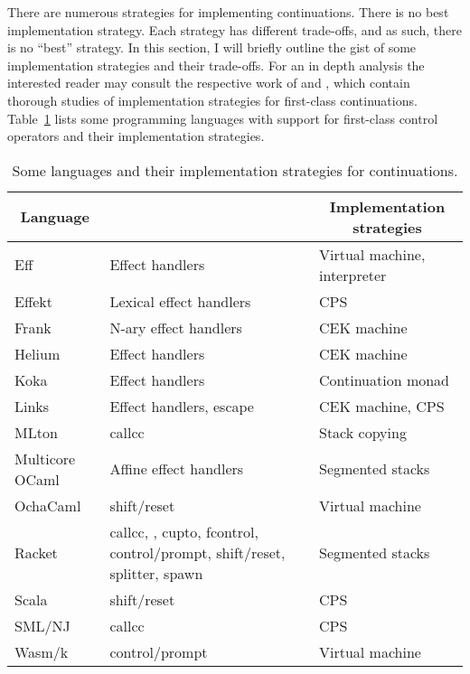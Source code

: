 \documentclass[12pt,phd,lfcs,twoside,openright,logo,leftchapter,normalheadings]{infthesis}
\theoremstyle{plain}
\theoremstyle{definition}
\begin{document}
There are numerous strategies for implementing continuations. There is
no best implementation strategy. Each strategy has different
trade-offs, and as such, there is no ``best'' strategy. In this
section, I will briefly outline the gist of some implementation
strategies and their trade-offs. For an in depth analysis the
interested reader may consult the respective work of
\citet{ClingerHO88} and \citet{FarvardinR20}, which contain thorough
studies of implementation strategies for first-class continuations.
%
Table~\ref{tbl:ctrl-operators-impls} lists some programming languages
with support for first-class control operators and their
implementation strategies.

\begin{table}
  \centering
  \begin{tabular}{| l | >{\raggedright}p{4.3cm} | l |}
    \hline
    \multicolumn{1}{|c|}{\textbf{Language}} & \multicolumn{1}{c |}{\textbf{Control operators}} & \multicolumn{1}{c|}{\textbf{Implementation strategies}}\\
    \hline
    Eff      & Effect handlers & Virtual machine, interpreter \\
    \hline
    Effekt   & Lexical effect handlers & CPS\\
    \hline
    Frank    & N-ary effect handlers & CEK machine \\
    \hline
    Helium   & Effect handlers & CEK machine \\
    \hline
    Koka     & Effect handlers & Continuation monad\\
    \hline
    Links    & Effect handlers, escape & CEK machine, CPS\\
    \hline
    MLton    & callcc & Stack copying\\
    \hline
    Multicore OCaml  & Affine effect handlers & Segmented stacks\\
    \hline
    OchaCaml & shift/reset & Virtual machine\\
    \hline
    Racket & callcc, \textCallcomc{}, cupto, fcontrol, control/prompt, shift/reset, splitter, spawn & Segmented stacks\\
    \hline
    Scala                 & shift/reset       & CPS\\
    \hline
    SML/NJ                & callcc            & CPS\\
    \hline
    Wasm/k                & control/prompt    & Virtual machine \\
    \hline
  \end{tabular}
  \caption{Some languages and their implementation strategies for continuations.}\label{tbl:ctrl-operators-impls}
\end{table}
\end{document}
